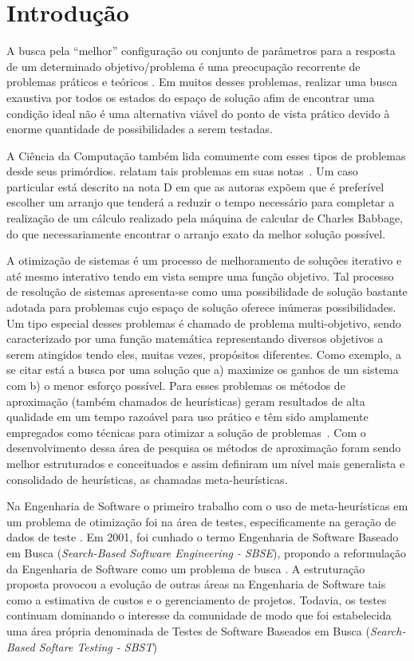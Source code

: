 \chapter[Introdução]{Introdução}

A busca pela ``melhor'' configuração ou conjunto de parâmetros para a resposta de um determinado objetivo/problema é uma preocupação recorrente de problemas práticos e teóricos \cite{combinatorialoptimization1998}. Em muitos desses problemas, realizar uma busca exaustiva por todos os estados do espaço de solução afim de encontrar uma condição ideal não é uma alternativa viável do ponto de vista prático devido à enorme quantidade de possibilidades a serem testadas. 

A Ciência da Computação também lida comumente com esses tipos de problemas desde seus primórdios.  relatam tais problemas em suas notas~\cite{menabrea1842sketch}. Um caso particular está descrito na nota D em que as autoras expõem que é preferível escolher um arranjo que tenderá a reduzir o tempo necessário para completar a realização de um cálculo realizado pela máquina de calcular de Charles Babbage, do que necessariamente encontrar o arranjo exato da melhor solução possível\cite{menabrea1842sketch}.

A otimização de sistemas é um processo de melhoramento de soluções iterativo e até mesmo interativo tendo em vista sempre uma função objetivo. Tal processo de resolução de sistemas apresenta-se como uma possibilidade de solução bastante adotada para problemas cujo espaço de solução oferece inúmeras possibilidades. Um tipo especial desses problemas é chamado de problema multi-objetivo, sendo caracterizado por uma função matemática representando diversos objetivos a serem atingidos tendo eles, muitas vezes, propósitos diferentes. Como exemplo, a se citar está a busca por uma solução que a) maximize os ganhos de um sistema com b) o menor esforço possível.  Para esses problemas os métodos de aproximação (também chamados de heurísticas) geram resultados de alta qualidade em um tempo razoável para uso prático e têm sido amplamente empregados como técnicas para otimizar a solução de problemas~\cite{gendreau2005metaheuristics}. Com o desenvolvimento dessa área de pesquisa os métodos de aproximação foram sendo melhor estruturados e conceituados e assim definiram um nível mais generalista e consolidado de heurísticas, as chamadas meta-heurísticas.

Na Engenharia de Software o primeiro trabalho com o uso de meta-heurísticas em um problema de otimização foi na área de testes, especificamente na geração de dados de teste \cite{miller1976automatic}. Em 2001, foi cunhado o termo Engenharia de Software Baseado em Busca (\textit{Search-Based Software Engineering - SBSE}), propondo a reformulação da Engenharia de Software como um problema de busca \cite{harman2001search}. A estruturação proposta provocou a evolução de outras áreas na Engenharia de Software tais como a estimativa de custos e o gerenciamento de projetos. Todavia, os testes continuam dominando o interesse da comunidade de modo que foi estabelecida  uma área própria denominada de Testes de Software Baseados em Busca (\textit{Search-Based Softare Testing - SBST}) \cite{harman2012search}

